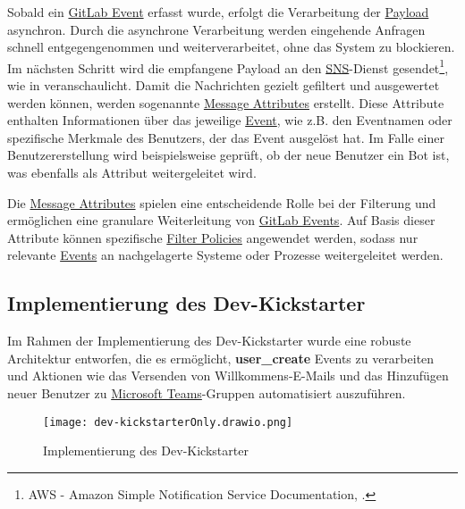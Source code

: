Sobald ein \hyperlink{GitLabEvent}{\textcolor{AOBlau}{GitLab Event}} erfasst wurde, erfolgt die Verarbeitung der \hyperlink{Payload}{\textcolor{AOBlau}{Payload}} asynchron. Durch die asynchrone Verarbeitung werden eingehende Anfragen schnell entgegengenommen und weiterverarbeitet, ohne das System zu blockieren. Im nächsten Schritt wird die empfangene Payload an den \hyperlink{SNS}{\textcolor{AOBlau}{SNS}}-Dienst gesendet\footnote{AWS - Amazon Simple Notification Service Documentation, \cite{aws2023sns}.}, wie in  veranschaulicht. Damit die Nachrichten gezielt gefiltert und ausgewertet werden können, werden sogenannte \hyperlink{MessageAttributes}{\textcolor{AOBlau}{Message Attributes}} erstellt. Diese Attribute enthalten Informationen über das jeweilige \hyperlink{GitLabEvent}{\textcolor{AOBlau}{Event}}, wie z.B. den Eventnamen oder spezifische Merkmale des Benutzers, der das Event ausgelöst hat. Im Falle einer Benutzererstellung wird beispielsweise geprüft, ob der neue Benutzer ein Bot ist, was ebenfalls als Attribut weitergeleitet wird.

Die \hyperlink{MessageAttributes}{\textcolor{AOBlau}{Message Attributes}} spielen eine entscheidende Rolle bei der Filterung und ermöglichen eine granulare Weiterleitung von \hyperlink{GitLabEvent}{\textcolor{AOBlau}{GitLab Events}}. Auf Basis dieser Attribute können spezifische \hyperlink{FilterPolicies}{\textcolor{AOBlau}{Filter Policies}} angewendet werden, sodass nur relevante \hyperlink{Events}{\textcolor{AOBlau}{Events}} an nachgelagerte Systeme oder Prozesse weitergeleitet werden.

\subsection{Implementierung des Dev-Kickstarter}
\label{sec:ImplementierungBenutzeroberflaeche}

Im Rahmen der Implementierung des Dev-Kickstarter wurde eine robuste Architektur entworfen, die es ermöglicht, \textbf{user\_create} Events zu verarbeiten und Aktionen wie das Versenden von Willkommens-E-Mails und das Hinzufügen neuer Benutzer zu \hyperlink{MicrosoftTeams}{\textcolor{AOBlau}{Microsoft Teams}}-Gruppen automatisiert auszuführen.


\begin{figure}[h!]
    \centering
    \texttt{[image: dev-kickstarterOnly.drawio.png]}
    \caption{Implementierung des Dev-Kickstarter}
\end{figure}

